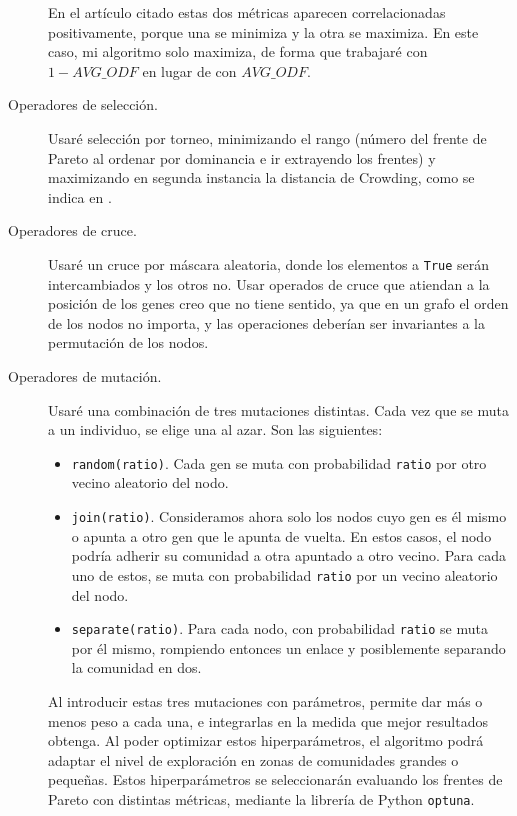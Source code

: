 \begin{description}
    En el artículo citado estas dos métricas aparecen correlacionadas positivamente,
    porque una se minimiza y la otra se maximiza. En este caso, mi algoritmo solo maximiza,
    de forma que trabajaré con \(1 - AVG\_ODF\) en lugar de con \(AVG\_ODF\).

  \item[Operadores de selección.] Usaré selección por torneo, minimizando el rango (número
    del frente de Pareto al ordenar por dominancia e ir extrayendo los frentes) y maximizando
    en segunda instancia la distancia de Crowding, como se indica en \cite{deb2002fastelitist}.

  \item[Operadores de cruce.] Usaré un cruce por máscara aleatoria, donde los elementos
    a \lstinline{True} serán intercambiados y los otros no. Usar operados de cruce que
    atiendan a la posición de los genes creo que no tiene sentido, ya que en un grafo el
    orden de los nodos no importa, y las operaciones deberían ser invariantes a la
    permutación de los nodos.

  \item[Operadores de mutación.] Usaré una combinación de tres mutaciones distintas. Cada
    vez que se muta a un individuo, se elige una al azar. Son las siguientes:
    \begin{itemize}
      \item \lstinline{random(ratio)}. Cada gen se muta con probabilidad
        \lstinline{ratio} por otro vecino aleatorio del nodo.

      \item \lstinline{join(ratio)}. Consideramos ahora solo los nodos cuyo gen
        es él mismo o apunta a otro gen que le apunta de vuelta. En estos
        casos, el nodo podría adherir su comunidad a otra apuntado a otro
        vecino. Para cada uno de estos, se muta con probabilidad
        \lstinline{ratio} por un vecino aleatorio del nodo.

      \item \lstinline{separate(ratio)}. Para cada nodo, con probabilidad
        \lstinline{ratio} se muta por él mismo, rompiendo entonces un enlace
        y posiblemente separando la comunidad en dos.
    \end{itemize}

    Al introducir estas tres mutaciones con parámetros, permite dar más o menos
    peso a cada una, e integrarlas en la medida que mejor resultados obtenga.
    Al poder optimizar estos hiperparámetros, el algoritmo podrá adaptar el
    nivel de exploración en zonas de comunidades grandes o pequeñas. Estos
    hiperparámetros se seleccionarán evaluando los frentes de Pareto con
    distintas métricas, mediante la librería de Python \lstinline{optuna}.
\end{description}

